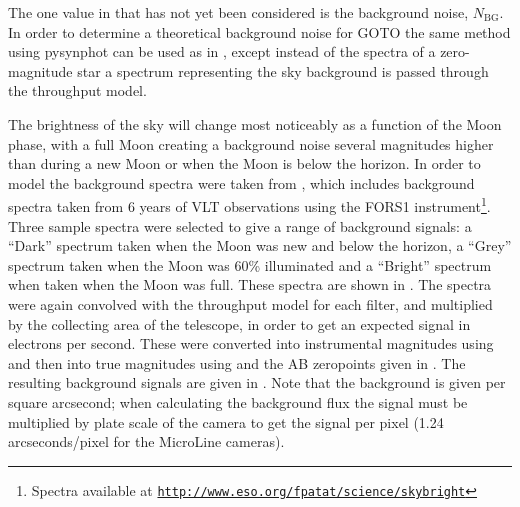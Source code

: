 \begin{colsection}
\begin{colsection}
The one value in  that has not yet been considered is the background noise, $N_\text{BG}$. In order to determine a theoretical background noise for GOTO the same method using pysynphot can be used as in , except instead of the spectra of a zero-magnitude star a spectrum representing the sky background is passed through the throughput model.

The brightness of the sky will change most noticeably as a function of the Moon phase, with a full Moon creating a background noise several magnitudes higher than during a new Moon or when the Moon is below the horizon. In order to model the background spectra were taken from \citet{sky_background}, which includes background spectra taken from 6 years of VLT observations using the FORS1 instrument\footnote{Spectra available at \href{http://www.eso.org/~fpatat/science/skybright}{\texttt{http://www.eso.org/\raisebox{0.5ex}{\texttildelow}fpatat/science/skybright}}}. Three sample spectra were selected to give a range of background signals: a ``Dark'' spectrum taken when the Moon was new and below the horizon, a ``Grey'' spectrum taken when the Moon was 60\% illuminated and a ``Bright'' spectrum when taken when the Moon was full. These spectra are shown in . The spectra were again convolved with the throughput model for each filter, and multiplied by the collecting area of the telescope, in order to get an expected signal in electrons per second. These were converted into instrumental magnitudes using  and then into true magnitudes using  and the AB zeropoints given in . The resulting background signals are given in . Note that the background is given per square arcsecond; when calculating the background flux the signal must be multiplied by plate scale of the camera to get the signal per pixel (1.24 arcseconds/pixel for the MicroLine cameras).


\end{colsection}
\end{colsection}
